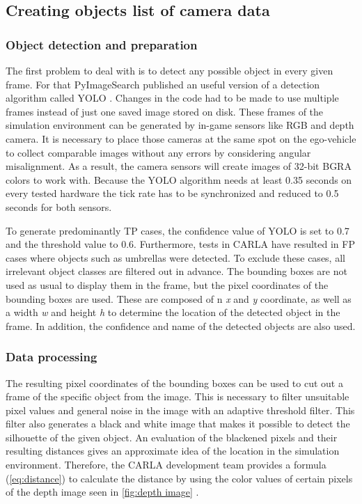 \subsection{Creating objects list of camera data}
\subsubsection{Object detection and preparation}
The first problem to deal with is to detect any possible object in every given frame. For that PyImageSearch published an useful version of a detection algorithm called \ac{YOLO} \cite{Yolo}. 
Changes in the code had to be made to use multiple frames instead of just one saved image stored on disk.
These frames of the simulation environment can be generated by in-game sensors like RGB and depth camera. It is necessary to place those cameras at the same spot on the ego-vehicle to collect comparable images without any errors by considering angular misalignment. As a result, the camera sensors will create images of 32-bit BGRA colors to work with. 
Because the \ac{YOLO} algorithm needs at least 0.35 seconds on every tested hardware the tick rate has to be synchronized and reduced to 0.5 seconds for both sensors.

To generate predominantly \ac{TP} cases, the confidence value of \ac{YOLO} is set to 0.7 and the threshold value to 0.6. Furthermore, tests in CARLA have resulted in \ac{FP} cases where objects such as umbrellas were detected. To exclude these cases, all irrelevant object classes are filtered out in advance. The bounding boxes are not used as usual to display them in the frame, but the pixel coordinates of the bounding boxes are used. These are composed of n \textit{x} and \textit{y} coordinate, as well as a width \textit{w} and height \textit{h} to determine the location of the detected object in the frame. In addition, the confidence and name of the detected objects are also used. 
\subsubsection{Data processing}
The resulting pixel coordinates of the bounding boxes can be used to cut out a frame of the specific object from the image. This is necessary to filter unsuitable pixel values and general noise in the image with an adaptive threshold filter. This filter also generates a black and white image that makes it possible to detect the silhouette of the given object. An evaluation of the blackened pixels and their resulting distances gives an approximate idea of the location in the simulation environment.
Therefore, the CARLA development team provides a formula (\cref{eq:distance}) to calculate the distance by using the color values of certain pixels of the depth image seen in \cref{fig:depth image} \cite{distance}. 

